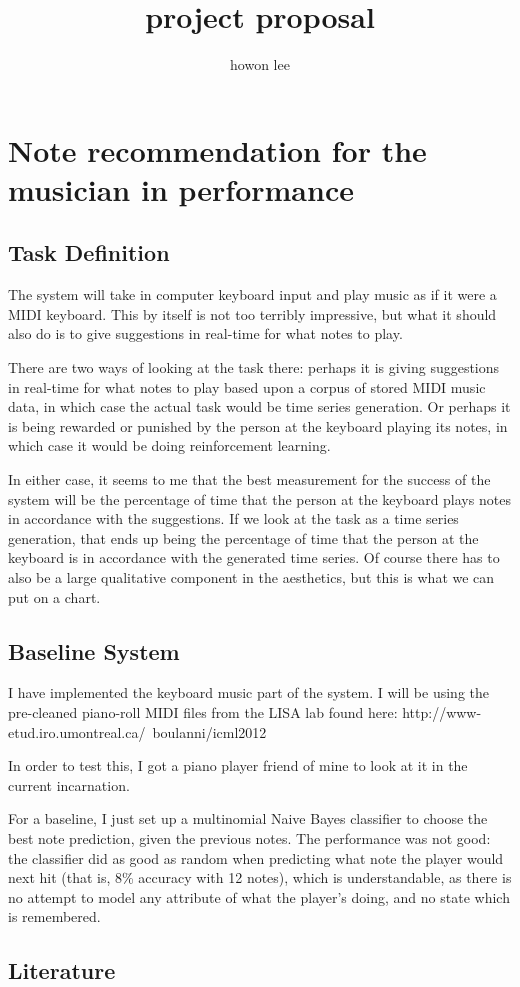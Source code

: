 \documentclass{article}
\begin{document}
\title{project proposal}
\author{howon lee}
\maketitle
\section{Note recommendation for the musician in performance}
\subsection{Task Definition}
The system will take in computer keyboard input and play music as if it were a MIDI keyboard. This by itself is not too terribly impressive, but what it should also do is to give suggestions in real-time for what notes to play.

There are two ways of looking at the task there: perhaps it is giving suggestions in real-time for what notes to play based upon a corpus of stored MIDI music data, in which case the actual task would be time series generation. Or perhaps it is being rewarded or punished by the person at the keyboard playing its notes, in which case it would be doing reinforcement learning.

In either case, it seems to me that the best measurement for the success of the system will be the percentage of time that the person at the keyboard plays notes in accordance with the suggestions. If we look at the task as a time series generation, that ends up being the percentage of time that the person at the keyboard is in accordance with the generated time series. Of course there has to also be a large qualitative component in the aesthetics, but this is what we can put on a chart.
\subsection{Baseline System}
I have implemented the keyboard music part of the system. I will be using the pre-cleaned piano-roll MIDI files from the LISA lab found here:
http://www-etud.iro.umontreal.ca/~boulanni/icml2012

In order to test this, I got a piano player friend of mine to look at it in the current incarnation.

For a baseline, I just set up a multinomial Naive Bayes classifier to choose the best note prediction, given the previous notes. The performance was not good: the classifier did as good as random when predicting what note the player would next hit (that is, 8\% accuracy with 12 notes), which is understandable, as there is no attempt to model any attribute of what the player's doing, and no state which is remembered.

\subsection{Literature}
\end{document}
